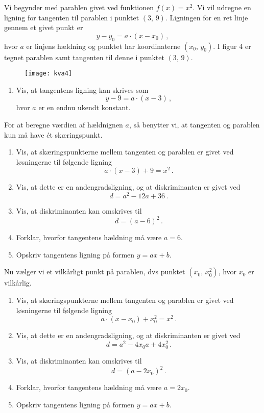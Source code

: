 \documentclass[12pt,oneside,a4paper]{article}
\theoremstyle{plain}
\begin{document}
Vi begynder med parablen givet ved funktionen $f(x)=x^2$. Vi vil udregne en ligning 
for tangenten til parablen i punktet $(3,\, 9)$. Ligningen for en ret linje gennem
et givet punkt er 
\[
    y-y_0 = a\cdot (x-x_0) \,,
\]
hvor $a$ er linjens hældning og punktet har koordinaterne $(x_0,\, y_0)$.
I figur 4 er tegnet parablen samt tangenten til denne i punktet $(3,\, 9)$.

\begin{figure}[ht]
    \centering
    \texttt{[image: kva4]}
    \caption{}
    \label{fig4}
\end{figure}

\begin{enumerate}[label=(\alph*)]
    \item Vis, at tangentens ligning kan skrives som 
        \[
            y-9 = a\cdot(x-3)\,,
        \]
    hvor $a$ er en endnu ukendt konstant.
\end{enumerate}
For at beregne værdien af hældnignen $a$, så benytter vi, at tangenten og parablen
kun må have ét skæringspunkt.

\begin{enumerate}[label=(\alph*), resume]
    \item Vis, at skæringspunkterne mellem tangenten og parablen er givet
        ved løsningerne til følgende ligning
        \[
            a\cdot(x-3) + 9 = x^2 \,.
        \]
    \item Vis, at dette er en andengradsligning, og at diskriminanten er givet ved
        \[
            d = a^2 - 12a + 36 \,.
        \]
    \item Vis, at diskriminanten kan omskrives til
        \[
            d = (a-6)^2 \,.
        \]
    \item Forklar, hvorfor tangentens hældning må være $a=6$.
    \item Opskriv tangentens ligning på formen $y=ax+b$.
\end{enumerate}

Nu vælger vi et vilkårligt punkt på parablen, dvs punktet $(x_0,\, x_0^2)$, hvor
$x_0$ er vilkårlig.
\begin{enumerate}[label=(\alph*), resume]
    \item Vis, at skæringspunkterne mellem tangenten og parablen er givet
        ved løsningerne til følgende ligning
        \[
            a\cdot(x-x_0) + x_0^2 = x^2 \,.
        \]
    \item Vis, at dette er en andengradsligning, og at diskriminanten er givet ved
        \[
            d = a^2 - 4x_0a + 4x_0^2 \,.
        \]
    \item Vis, at diskriminanten kan omskrives til
        \[
            d = (a-2x_0)^2 \,.
        \]
    \item Forklar, hvorfor tangentens hældning må være $a=2x_0$.
    \item Opskriv tangentens ligning på formen $y=ax+b$.
\end{enumerate}
\end{document}
